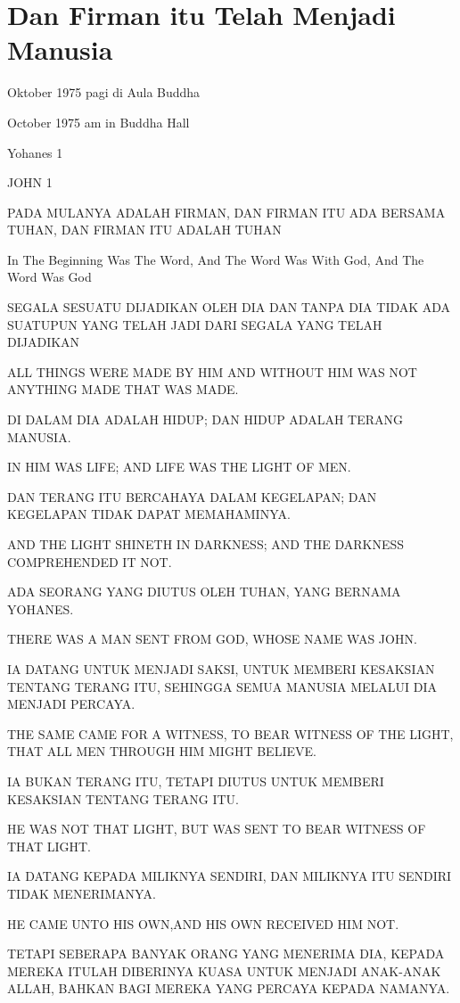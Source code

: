 \chapter{Dan Firman itu Telah Menjadi Manusia}

 Oktober 1975 pagi di Aula Buddha

 October 1975 am in Buddha Hall

\bahasa
Yohanes 1

\english
JOHN 1

 PADA MULANYA ADALAH FIRMAN, DAN FIRMAN ITU ADA BERSAMA TUHAN, DAN FIRMAN ITU ADALAH TUHAN

 In The Beginning Was The Word, And The Word Was With God, And The Word Was God

 SEGALA SESUATU DIJADIKAN OLEH DIA DAN TANPA DIA TIDAK ADA SUATUPUN YANG TELAH JADI DARI SEGALA YANG TELAH DIJADIKAN

 ALL THINGS WERE MADE BY HIM AND WITHOUT HIM WAS NOT ANYTHING MADE THAT WAS MADE.

 DI DALAM DIA ADALAH HIDUP; DAN HIDUP ADALAH TERANG MANUSIA.

 IN HIM WAS LIFE; AND LIFE WAS THE LIGHT OF MEN.

 DAN TERANG ITU BERCAHAYA DALAM KEGELAPAN; DAN KEGELAPAN TIDAK DAPAT MEMAHAMINYA.

 AND THE LIGHT SHINETH IN DARKNESS; AND THE DARKNESS COMPREHENDED IT NOT.

 ADA SEORANG YANG DIUTUS OLEH TUHAN, YANG BERNAMA YOHANES.

 THERE WAS A MAN SENT FROM GOD, WHOSE NAME WAS JOHN.

 IA DATANG UNTUK MENJADI SAKSI, UNTUK MEMBERI KESAKSIAN TENTANG TERANG ITU, SEHINGGA SEMUA MANUSIA MELALUI DIA MENJADI PERCAYA.

 THE SAME CAME FOR A WITNESS, TO BEAR WITNESS OF THE LIGHT, THAT ALL MEN THROUGH HIM MIGHT BELIEVE.

 IA BUKAN TERANG ITU, TETAPI DIUTUS UNTUK MEMBERI KESAKSIAN TENTANG TERANG ITU.

 HE WAS NOT THAT LIGHT, BUT WAS SENT TO BEAR WITNESS OF THAT LIGHT.

 IA DATANG KEPADA MILIKNYA SENDIRI, DAN MILIKNYA ITU SENDIRI TIDAK MENERIMANYA.

 HE CAME UNTO HIS OWN,AND HIS OWN RECEIVED HIM NOT.

 TETAPI SEBERAPA BANYAK ORANG YANG MENERIMA DIA, KEPADA MEREKA ITULAH DIBERINYA KUASA UNTUK MENJADI ANAK-ANAK ALLAH, BAHKAN BAGI MEREKA YANG PERCAYA KEPADA NAMANYA.

